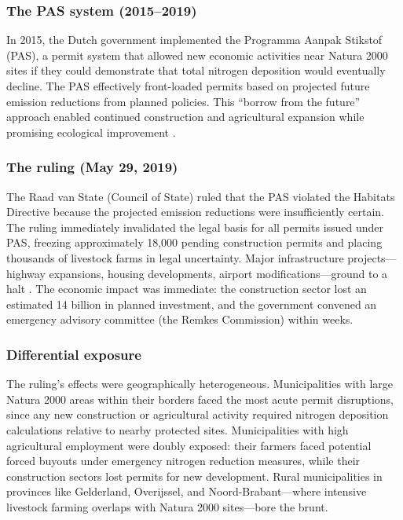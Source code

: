 \documentclass[12pt]{article}
\begin{document}
\subsubsection*{The PAS system (2015--2019)} In 2015, the Dutch government implemented the Programma Aanpak Stikstof (PAS), a permit system that allowed new economic activities near Natura 2000 sites if they could demonstrate that total nitrogen deposition would eventually decline. The PAS effectively front-loaded permits based on projected future emission reductions from planned policies. This ``borrow from the future'' approach enabled continued construction and agricultural expansion while promising ecological improvement \citep{backes2017}.

\subsubsection*{The ruling (May 29, 2019)} The Raad van State (Council of State) ruled that the PAS violated the Habitats Directive because the projected emission reductions were insufficiently certain. The ruling immediately invalidated the legal basis for all permits issued under PAS, freezing approximately 18,000 pending construction permits and placing thousands of livestock farms in legal uncertainty. Major infrastructure projects---highway expansions, housing developments, airport modifications---ground to a halt \citep{vangrinsven2019}. The economic impact was immediate: the construction sector lost an estimated \texteuro{}14 billion in planned investment, and the government convened an emergency advisory committee (the Remkes Commission) within weeks.

\subsubsection*{Differential exposure} The ruling's effects were geographically heterogeneous. Municipalities with large Natura 2000 areas within their borders faced the most acute permit disruptions, since any new construction or agricultural activity required nitrogen deposition calculations relative to nearby protected sites. Municipalities with high agricultural employment were doubly exposed: their farmers faced potential forced buyouts under emergency nitrogen reduction measures, while their construction sectors lost permits for new development. Rural municipalities in provinces like Gelderland, Overijssel, and Noord-Brabant---where intensive livestock farming overlaps with Natura 2000 sites---bore the brunt.
\end{document}
